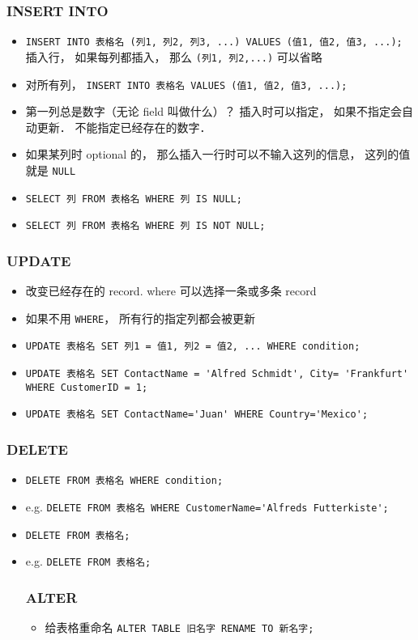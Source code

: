 \subsubsection{INSERT INTO}
\begin{itemize}
\item \verb`INSERT INTO 表格名 (列1, 列2, 列3, ...) VALUES (值1, 值2, 值3, ...);` 插入行， 如果每列都插入， 那么 \verb`(列1, 列2,...)` 可以省略
\item 对所有列， \verb`INSERT INTO 表格名 VALUES (值1, 值2, 值3, ...);`
\item 第一列总是数字（无论 field 叫做什么）？ 插入时可以指定，  如果不指定会自动更新． 不能指定已经存在的数字．
\item 如果某列时 optional 的， 那么插入一行时可以不输入这列的信息， 这列的值就是 \verb`NULL`
\item \verb`SELECT 列 FROM 表格名 WHERE 列 IS NULL;`
\item \verb`SELECT 列 FROM 表格名 WHERE 列 IS NOT NULL;`
\end{itemize}

\subsubsection{UPDATE}
\begin{itemize}
\item 改变已经存在的 record. where 可以选择一条或多条 record
\item 如果不用 \verb`WHERE`， 所有行的指定列都会被更新
\item \verb`UPDATE 表格名 SET 列1 = 值1, 列2 = 值2, ... WHERE condition;`
\item \verb`UPDATE 表格名 SET ContactName = 'Alfred Schmidt', City= 'Frankfurt' WHERE CustomerID = 1;`
\item \verb`UPDATE 表格名 SET ContactName='Juan' WHERE Country='Mexico';`
\end{itemize}

\subsubsection{DELETE}
\begin{itemize}
\item \verb`DELETE FROM 表格名 WHERE condition;`
\item e.g. \verb`DELETE FROM 表格名 WHERE CustomerName='Alfreds Futterkiste';`
\item \verb`DELETE FROM 表格名;`
\item e.g. \verb`DELETE FROM 表格名;`

\subsubsection{ALTER}
\begin{itemize}
\item 给表格重命名 \verb|ALTER TABLE 旧名字 RENAME TO 新名字;|
\end{itemize}

\end{itemize}
